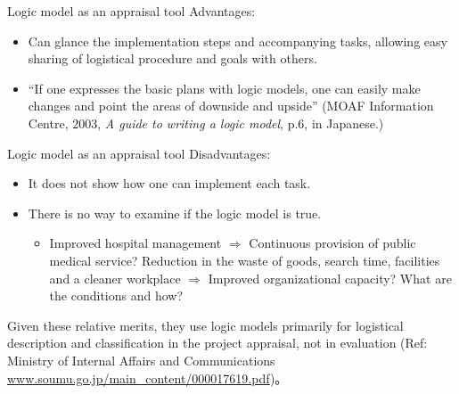 \begin{frame}{Logic model as an appraisal tool}
Advantages:
\begin{itemize}
\vspace{1.0ex}\setlength{\itemsep}{1.0ex}\setlength{\baselineskip}{12pt}
\item	Can glance the implementation steps and accompanying tasks, allowing easy sharing of logistical procedure and goals with others.
\item	``If one expresses the basic plans with logic models, one can easily make changes and point the areas of downside and upside'' (MOAF Information Centre, 2003, \textit{A guide to writing a logic model}, p.6, in Japanese.)
\end{itemize}
\end{frame}

\begin{frame}{Logic model as an appraisal tool}
Disadvantages:
\begin{itemize}
\vspace{1.0ex}\setlength{\itemsep}{1.0ex}\setlength{\baselineskip}{12pt}
\item	It does not show how one can implement each task.
\item	There is no way to examine if the logic model is true. 
	\begin{itemize}
	\vspace{1.0ex}\setlength{\itemsep}{1.0ex}\setlength{\baselineskip}{10pt}
		\item	{\footnotesize Improved hospital management $\Rightarrow$ Continuous provision of public medical service? Reduction in the waste of goods, search time, facilities and a cleaner workplace $\Rightarrow$ Improved organizational capacity? What are the conditions and how?}
	\end{itemize}
\end{itemize}
Given these relative merits, they use logic models primarily for logistical description and classification in the project appraisal, not in evaluation (Ref:  Ministry of Internal Affairs and Communications \url{www.soumu.go.jp/main_content/000017619.pdf})。
\end{frame}

